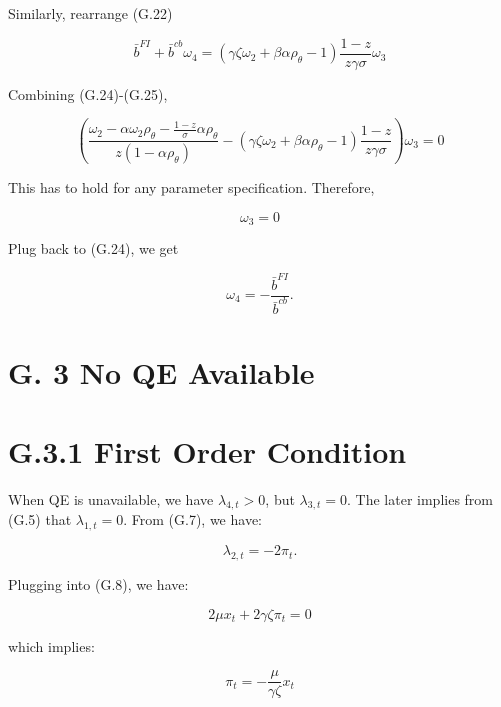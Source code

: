 \documentclass[10pt]{article}
\begin{document}
Similarly, rearrange (G.22)

\begin{equation*}
\bar{b}^{F I}+\bar{b}^{c b} \omega_{4}=\left(\gamma \zeta \omega_{2}+\beta \alpha \rho_{\theta}-1\right) \frac{1-z}{z \gamma \sigma} \omega_{3} \tag{G.25}
\end{equation*}

Combining (G.24)-(G.25),

\begin{equation*}
\left(\frac{\omega_{2}-\alpha \omega_{2} \rho_{\theta}-\frac{1-z}{\sigma} \alpha \rho_{\theta}}{z\left(1-\alpha \rho_{\theta}\right)}-\left(\gamma \zeta \omega_{2}+\beta \alpha \rho_{\theta}-1\right) \frac{1-z}{z \gamma \sigma}\right) \omega_{3}=0
\end{equation*}

This has to hold for any parameter specification. Therefore,

\begin{equation*}
\omega_{3}=0
\end{equation*}

Plug back to (G.24), we get

\begin{equation*}
\omega_{4}=-\frac{\bar{b}^{F I}}{\bar{b}^{c b}} .
\end{equation*}

\section*{G. 3 No QE Available}
\section*{G.3.1 First Order Condition}
When QE is unavailable, we have $\lambda_{4, t}>0$, but $\lambda_{3, t}=0$. The later implies from (G.5) that $\lambda_{1, t}=0$. From (G.7), we have:

\begin{equation*}
\lambda_{2, t}=-2 \pi_{t} . \tag{G.26}
\end{equation*}

Plugging into (G.8), we have:

\begin{equation*}
2 \mu x_{t}+2 \gamma \zeta \pi_{t}=0 \tag{G.27}
\end{equation*}

which implies:

\begin{equation*}
\pi_{t}=-\frac{\mu}{\gamma \zeta} x_{t} \tag{G.28}
\end{equation*}
\end{document}

